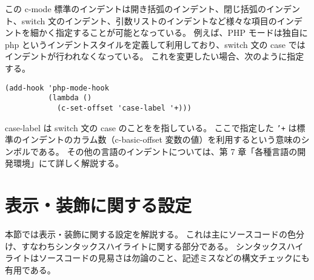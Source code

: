 この c-mode 標準のインデントは開き括弧のインデント、閉じ括弧のインデント、switch 文のインデント、引数リストのインデントなど様々な項目のインデントを細かく指定することが可能となっている。
例えば、PHP モードは独自に php というインデントスタイルを定義して利用しており、switch 文の case ではインデントが行われなくなっている。
これを変更したい場合、次のように指定する。
\begin{mdframed}[roundcorner=0.50zw,leftmargin=3.00zw,rightmargin=3.00zw,skipabove=0.40zw,skipbelow=0.40zw,innertopmargin=4.00pt,innerbottommargin=4.00pt,innerleftmargin=5.00pt,innerrightmargin=5.00pt,linecolor=gray!020,linewidth=0.50pt,backgroundcolor=gray!20]
\begin{verbatim}
(add-hook 'php-mode-hook
          (lambda ()
            (c-set-offset 'case-label '+)))
\end{verbatim}
\end{mdframed}
case-label は switch 文の case のことをを指している。
ここで指定した \texttt{'+} は標準のインデントのカラム数（c-basic-offset 変数の値）を利用するという意味のシンボルである。
その他の言語のインデントについては、第 7 章「各種言語の開発環境」にて詳しく解説する。
\section{表示・装飾に関する設定}
本節では表示・装飾に関する設定を解説する。
これは主にソースコードの色分け、すなわちシンタックスハイライトに関する部分である。
シンタックスハイライトはソースコードの見易さは勿論のこと、記述ミスなどの構文チェックにも有用である。
